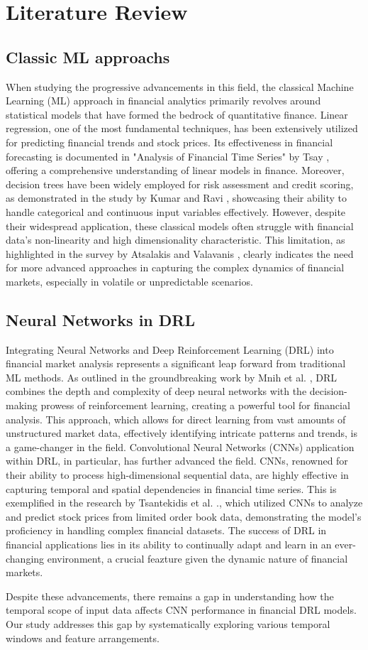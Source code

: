 \section{Literature Review}
\label{sec:litriv}

\subsection{Classic ML approachs}
When studying the progressive advancements in this field, the classical Machine Learning (ML) approach in financial analytics primarily revolves around statistical models that have formed the bedrock of quantitative finance. Linear regression, one of the most fundamental techniques, has been extensively utilized for predicting financial trends and stock prices. Its effectiveness in financial forecasting is documented in "Analysis of Financial Time Series" by Tsay \cite{Tsay2010}, offering a comprehensive understanding of linear models in finance. Moreover, decision trees have been widely employed for risk assessment and credit scoring, as demonstrated in the study by Kumar and Ravi \cite{Kumar2007}, showcasing their ability to handle categorical and continuous input variables effectively. However, despite their widespread application, these classical models often struggle with financial data's non-linearity and high dimensionality characteristic. This limitation, as highlighted in the survey by Atsalakis and Valavanis \cite{Atsalakis2009}, clearly indicates the need for more advanced approaches in capturing the complex dynamics of financial markets, especially in volatile or unpredictable scenarios.

\subsection{Neural Networks in DRL}
Integrating Neural Networks and Deep Reinforcement Learning (DRL) into financial market analysis represents a significant leap forward from traditional ML methods. As outlined in the groundbreaking work by Mnih et al. \cite{Mnih2015}, DRL combines the depth and complexity of deep neural networks with the decision-making prowess of reinforcement learning, creating a powerful tool for financial analysis. This approach, which allows for direct learning from vast amounts of unstructured market data, effectively identifying intricate patterns and trends, is a game-changer in the field. Convolutional Neural Networks (CNNs) application within DRL, in particular, has further advanced the field. CNNs, renowned for their ability to process high-dimensional sequential data, are highly effective in capturing temporal and spatial dependencies in financial time series. This is exemplified in the research by Tsantekidis et al. \cite{Tsantekidis2017}., which utilized CNNs to analyze and predict stock prices from limited order book data, demonstrating the model's proficiency in handling complex financial datasets. The success of DRL in financial applications lies in its ability to continually adapt and learn in an ever-changing environment, a crucial feazture given the dynamic nature of financial markets. 

Despite these advancements, there remains a gap in understanding how the temporal scope of input data affects CNN performance in financial DRL models. Our study addresses this gap by systematically exploring various temporal windows and feature arrangements.
